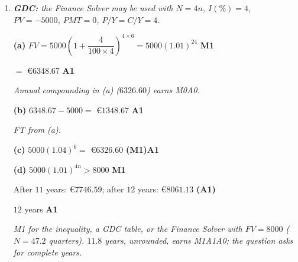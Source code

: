 \documentclass[12pt, twoside]{article}
\begin{document}
\begin{enumerate}[itemsep=0.3cm]
\item[8.] [Maximum mark: 8]

\emph{\textbf{GDC:} the Finance Solver may be used with $N = 4n$,
$I(\%) = 4$, $PV = -5000$, $PMT = 0$, $P/Y = C/Y = 4$.}

\textbf{(a)} $FV = 5000\left(1 + \dfrac{4}{100 \times 4}\right)^{4 \times 6}
= 5000(1.01)^{24}$ \hfill \textbf{M1}

$= $ \euro$6348.67$ \hfill \textbf{A1}

\emph{Annual compounding in (a) ($6326.60$) earns M0A0.}

\textbf{(b)} $6348.67 - 5000 = $ \euro$1348.67$ \hfill \textbf{A1}

\emph{FT from (a).}

\textbf{(c)} $5000(1.04)^{6} = $ \euro$6326.60$ \hfill \textbf{(M1)A1}

\textbf{(d)} $5000(1.01)^{4n} > 8000$ \hfill \textbf{M1}

After $11$ years: \euro$7746.59$; after $12$ years: \euro$8061.13$
\hfill \textbf{(A1)}

$12$ years \hfill \textbf{A1}

\emph{M1 for the inequality, a GDC table, or the Finance Solver with
$FV = 8000$ ($N = 47.2$ quarters). $11.8$ years, unrounded, earns M1A1A0;
the question asks for complete years.}

\end{enumerate}
\end{document}
